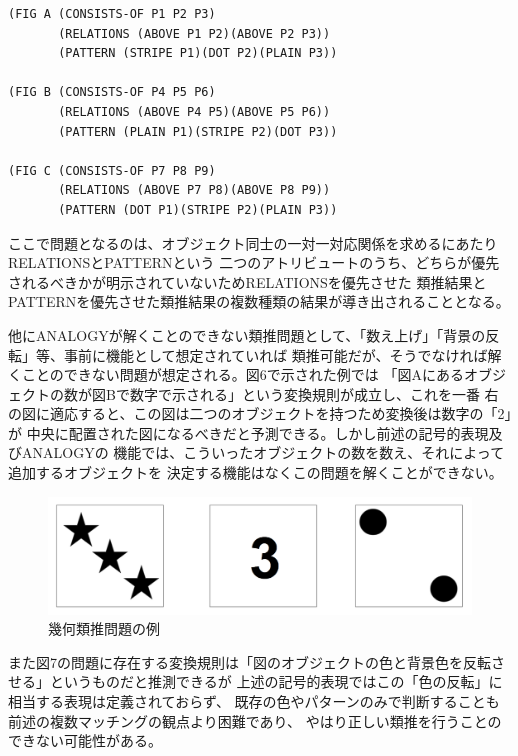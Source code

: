 \documentclass[uplatex]{jsarticle}
\begin{document}
\begin{lstlisting}[basicstyle=\ttfamily\footnotesize, frame=single]
(FIG A (CONSISTS-OF P1 P2 P3)
       (RELATIONS (ABOVE P1 P2)(ABOVE P2 P3))
       (PATTERN (STRIPE P1)(DOT P2)(PLAIN P3))

(FIG B (CONSISTS-OF P4 P5 P6)
       (RELATIONS (ABOVE P4 P5)(ABOVE P5 P6))
       (PATTERN (PLAIN P1)(STRIPE P2)(DOT P3))

(FIG C (CONSISTS-OF P7 P8 P9)
       (RELATIONS (ABOVE P7 P8)(ABOVE P8 P9))
       (PATTERN (DOT P1)(STRIPE P2)(PLAIN P3))
\end{lstlisting}

ここで問題となるのは、オブジェクト同士の一対一対応関係を求めるにあたりRELATIONSとPATTERNという
二つのアトリビュートのうち、どちらが優先されるべきかが明示されていないためRELATIONSを優先させた
類推結果とPATTERNを優先させた類推結果の複数種類の結果が導き出されることとなる。

他にANALOGYが解くことのできない類推問題として、「数え上げ」「背景の反転」等、事前に機能として想定されていれば
類推可能だが、そうでなければ解くことのできない問題が想定される。図6で示された例では
「図Aにあるオブジェクトの数が図Bで数字で示される」という変換規則が成立し、これを一番
右の図に適応すると、この図は二つのオブジェクトを持つため変換後は数字の「2」が
中央に配置された図になるべきだと予測できる。しかし前述の記号的表現及びANALOGYの
機能では、こういったオブジェクトの数を数え、それによって追加するオブジェクトを
決定する機能はなくこの問題を解くことができない。

\begin{figure}
  \begin{center}
    \includegraphics[width=13cm]{img/numbering.png}
    \caption{幾何類推問題の例}
  \end{center}
\end{figure}

また図7の問題に存在する変換規則は「図のオブジェクトの色と背景色を反転させる」というものだと推測できるが
上述の記号的表現ではこの「色の反転」に相当する表現は定義されておらず、
既存の色やパターンのみで判断することも前述の複数マッチングの観点より困難であり、
やはり正しい類推を行うことのできない可能性がある。
\end{document}
